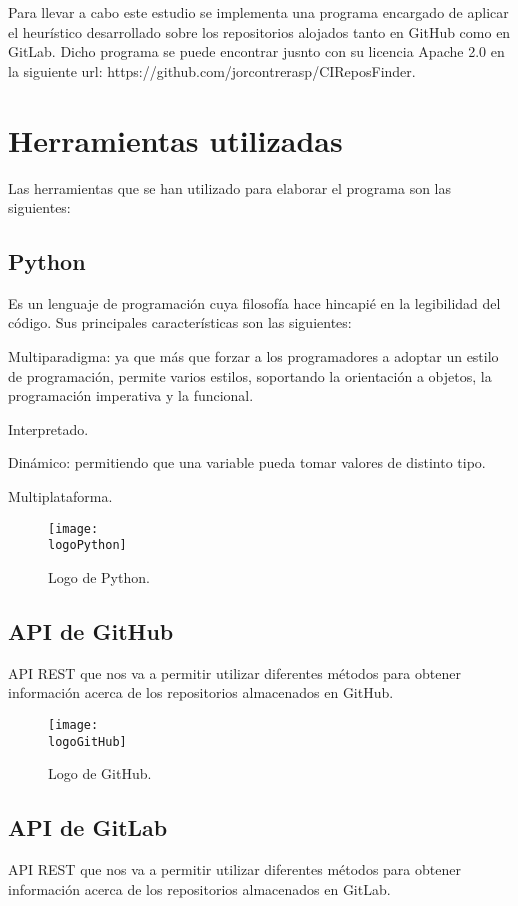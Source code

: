 Para llevar a cabo este estudio se implementa una programa encargado de aplicar el heurístico desarrollado sobre los repositorios alojados tanto en GitHub como en GitLab.
Dicho programa se puede encontrar jusnto con su licencia Apache 2.0 en la siguiente url: https://github.com/jorcontrerasp/CIReposFinder.

\section{Herramientas utilizadas}
Las herramientas que se han utilizado para elaborar el programa son las siguientes:
\subsection{Python}
Es un lenguaje de programación cuya filosofía hace hincapié en la legibilidad del código. Sus principales características son las siguientes:
\begin{compactitem}
    \item Multiparadigma: ya que más que forzar a los programadores a adoptar un estilo de programación, permite varios estilos, soportando la orientación a objetos, la programación imperativa y la funcional.
    \item Interpretado.
    \item Dinámico: permitiendo que una variable pueda tomar valores de distinto tipo.
    \item Multiplataforma.
\end{compactitem}

\begin{figure}[h]
    \centering
    \texttt{[image: \\logoPython]}
    \caption{Logo de Python.}
\end{figure}

\subsection{API de GitHub}
API REST que nos va a permitir utilizar diferentes métodos para obtener información acerca de los repositorios almacenados en GitHub.

\begin{figure}[h]
    \centering
    \texttt{[image: \\logoGitHub]}
    \caption{Logo de GitHub.}
\end{figure}

\subsection{API de GitLab}
API REST que nos va a permitir utilizar diferentes métodos para obtener información acerca de los repositorios almacenados en GitLab.

